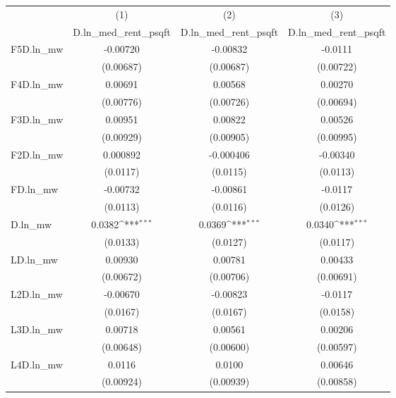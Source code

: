 {
\def\sym#1{\ifmmode^{#1}\else\(^{#1}\)\fi}
\begin{tabular}{l*{3}{c}}
\hline\hline
          &\multicolumn{1}{c}{(1)}&\multicolumn{1}{c}{(2)}&\multicolumn{1}{c}{(3)}\\
          &\multicolumn{1}{c}{D.ln\_med\_rent\_psqft}&\multicolumn{1}{c}{D.ln\_med\_rent\_psqft}&\multicolumn{1}{c}{D.ln\_med\_rent\_psqft}\\
\hline
F5D.ln\_mw & -0.00720         & -0.00832         &  -0.0111         \\
          &(0.00687)         &(0.00687)         &(0.00722)         \\
[1em]
F4D.ln\_mw &  0.00691         &  0.00568         &  0.00270         \\
          &(0.00776)         &(0.00726)         &(0.00694)         \\
[1em]
F3D.ln\_mw &  0.00951         &  0.00822         &  0.00526         \\
          &(0.00929)         &(0.00905)         &(0.00995)         \\
[1em]
F2D.ln\_mw & 0.000892         &-0.000406         & -0.00340         \\
          & (0.0117)         & (0.0115)         & (0.0113)         \\
[1em]
FD.ln\_mw  & -0.00732         & -0.00861         &  -0.0117         \\
          & (0.0113)         & (0.0116)         & (0.0126)         \\
[1em]
D.ln\_mw   &   0.0382\sym{***}&   0.0369\sym{***}&   0.0340\sym{***}\\
          & (0.0133)         & (0.0127)         & (0.0117)         \\
[1em]
LD.ln\_mw  &  0.00930         &  0.00781         &  0.00433         \\
          &(0.00672)         &(0.00706)         &(0.00691)         \\
[1em]
L2D.ln\_mw & -0.00670         & -0.00823         &  -0.0117         \\
          & (0.0167)         & (0.0167)         & (0.0158)         \\
[1em]
L3D.ln\_mw &  0.00718         &  0.00561         &  0.00206         \\
          &(0.00648)         &(0.00600)         &(0.00597)         \\
[1em]
L4D.ln\_mw &   0.0116         &   0.0100         &  0.00646         \\
          &(0.00924)         &(0.00939)         &(0.00858)         \\

\end{tabular}}
